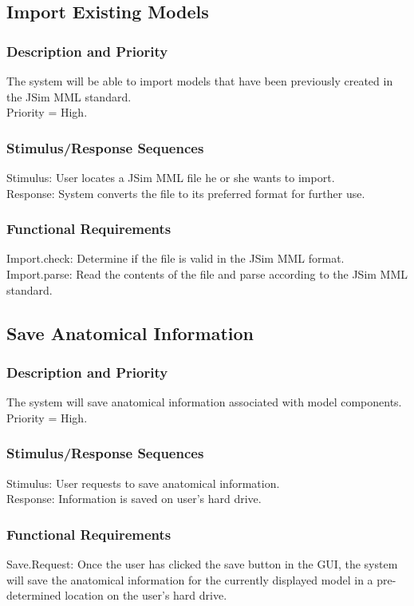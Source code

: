 \documentclass{article}
\begin{document}
\subsection{Import Existing Models}

\subsubsection{Description and Priority}
The system will be able to import models that have been previously created in the JSim MML standard.\\
Priority = High.

\subsubsection{Stimulus/Response Sequences}
Stimulus: User locates a JSim MML file he or she wants to import.\\
Response: System converts the file to its preferred format for further use.

\subsubsection{Functional Requirements}
Import.check: Determine if the file is valid in the JSim MML format.\\
Import.parse: Read the contents of the file and parse according to the JSim MML standard.

\subsection{Save Anatomical Information}
\subsubsection{Description and Priority}
The system will save anatomical information associated with model components.\\
Priority = High.

\subsubsection{Stimulus/Response Sequences}
Stimulus: User requests to save anatomical information.\\
Response: Information is saved on user's hard drive.

\subsubsection{Functional Requirements}
Save.Request: Once the user has clicked the save button in the GUI, the system will save the anatomical information for the currently displayed model in a pre-determined location on the user's hard drive.
\end{document}
